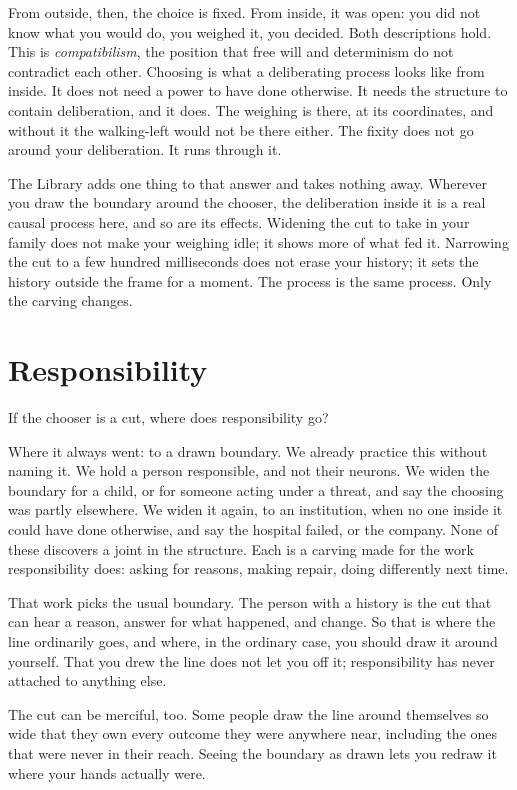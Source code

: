 From outside, then, the choice is fixed. From inside, it was open: you did not know what you would do, you weighed it, you decided. Both descriptions hold. This is \emph{compatibilism}, the position that free will and determinism do not contradict each other. Choosing is what a deliberating process looks like from inside. It does not need a power to have done otherwise. It needs the structure to contain deliberation, and it does. The weighing is there, at its coordinates, and without it the walking-left would not be there either. The fixity does not go around your deliberation. It runs through it.

The Library adds one thing to that answer and takes nothing away. Wherever you draw the boundary around the chooser, the deliberation inside it is a real causal process here, and so are its effects. Widening the cut to take in your family does not make your weighing idle; it shows more of what fed it. Narrowing the cut to a few hundred milliseconds does not erase your history; it sets the history outside the frame for a moment. The process is the same process. Only the carving changes.

\section*{Responsibility}

If the chooser is a cut, where does responsibility go?

Where it always went: to a drawn boundary. We already practice this without naming it. We hold a person responsible, and not their neurons. We widen the boundary for a child, or for someone acting under a threat, and say the choosing was partly elsewhere. We widen it again, to an institution, when no one inside it could have done otherwise, and say the hospital failed, or the company. None of these discovers a joint in the structure. Each is a carving made for the work responsibility does: asking for reasons, making repair, doing differently next time.

That work picks the usual boundary. The person with a history is the cut that can hear a reason, answer for what happened, and change. So that is where the line ordinarily goes, and where, in the ordinary case, you should draw it around yourself. That you drew the line does not let you off it; responsibility has never attached to anything else.

The cut can be merciful, too. Some people draw the line around themselves so wide that they own every outcome they were anywhere near, including the ones that were never in their reach. Seeing the boundary as drawn lets you redraw it where your hands actually were.

